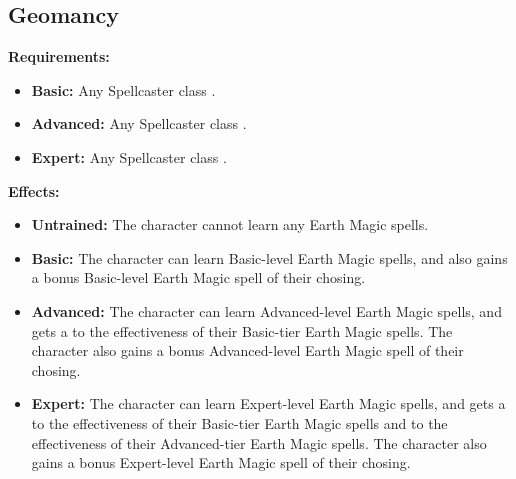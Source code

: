 \documentclass[openany,10pt,a4paper]{book}
\begin{document}
\subsection{Geomancy}
\begin{table}[!ht]
\centering
{}
\end{table}
\textbf{Requirements:}
\begin{itemize}
	\item \textbf{Basic:} Any Spellcaster class .
	\item \textbf{Advanced:} Any Spellcaster class .
	\item \textbf{Expert:} Any Spellcaster class .
\end{itemize}
\textbf{Effects:}
\begin{itemize}
	\item \textbf{Untrained:} The character cannot learn any Earth Magic spells.
	\item \textbf{Basic:} The character can learn Basic-level Earth Magic spells, and also gains a bonus Basic-level Earth Magic spell of their chosing.
	\item \textbf{Advanced:} The character can learn Advanced-level Earth Magic spells, and gets a  to the effectiveness of their Basic-tier Earth Magic spells. The character also gains a bonus Advanced-level Earth Magic spell of their chosing.
	\item \textbf{Expert:} The character can learn Expert-level Earth Magic spells, and gets a  to the effectiveness of their Basic-tier Earth Magic spells and  to the effectiveness of their Advanced-tier Earth Magic spells. The character also gains a bonus Expert-level Earth Magic spell of their chosing.
\end{itemize}\newpage
\end{document}
